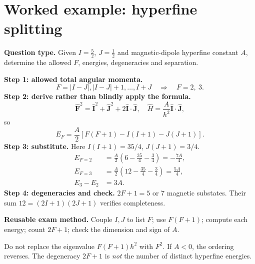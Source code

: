 
\section{Worked example: hyperfine splitting}
\textbf{Question type.} Given \(I=\frac52\), \(J=\frac12\) and magnetic-dipole
hyperfine constant \(A\), determine the allowed \(F\), energies,
degeneracies and separation.

\textbf{Step 1: allowed total angular momenta.}
\[
F=|I-J|,|I-J|+1,\ldots,I+J
\quad\Longrightarrow\quad F=2,\ 3.
\]
\textbf{Step 2: derive rather than blindly apply the formula.}
\[
\hat{\mathbf F}^2=\hat{\mathbf I}^2+\hat{\mathbf J}^2+
2\hat{\mathbf I}\cdot\hat{\mathbf J},
\quad
\hat H=\frac A{\hbar^2}\hat{\mathbf I}\cdot\hat{\mathbf J},
\]
so
\[
E_F=\frac A2[F(F+1)-I(I+1)-J(J+1)].
\]
\textbf{Step 3: substitute.} Here \(I(I+1)=35/4\),
\(J(J+1)=3/4\).
\begin{align*}
E_{F=2}&=\frac A2\left(6-\frac{35}{4}-\frac34\right)
=-\frac{7A}{4},\\
E_{F=3}&=\frac A2\left(12-\frac{35}{4}-\frac34\right)
=\frac{5A}{4},\\
E_3-E_2&=3A.
\end{align*}
\textbf{Step 4: degeneracies and check.}
\(2F+1=5\) or \(7\) magnetic substates.
Their sum \(12=(2I+1)(2J+1)\) verifies completeness.

\begin{methodbox}
\textbf{Reusable exam method.} Couple \(I,J\) to list \(F\);
use \(F(F+1)\); compute each energy; count \(2F+1\);
check the dimension and sign of \(A\).
\end{methodbox}
\begin{cautionbox}
Do not replace the eigenvalue \(F(F+1)\hbar^2\) with \(F^2\).
If \(A<0\), the ordering reverses. The degeneracy \(2F+1\)
is \emph{not} the number of distinct hyperfine energies.
\end{cautionbox}
